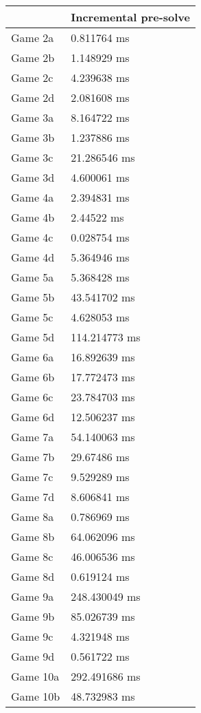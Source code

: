 \begin{tabular}{|l|l|}
	\hline
	& Incremental pre-solve \\ \hline
	Game 2a & 0.811764 ms \\ \hline
	Game 2b & 1.148929 ms \\ \hline
	Game 2c & 4.239638 ms \\ \hline
	Game 2d & 2.081608 ms \\ \hline
	Game 3a & 8.164722 ms \\ \hline
	Game 3b & 1.237886 ms \\ \hline
	Game 3c & 21.286546 ms \\ \hline
	Game 3d & 4.600061 ms \\ \hline
	Game 4a & 2.394831 ms \\ \hline
	Game 4b & 2.44522 ms \\ \hline
	Game 4c & 0.028754 ms \\ \hline
	Game 4d & 5.364946 ms \\ \hline
	Game 5a & 5.368428 ms \\ \hline
	Game 5b & 43.541702 ms \\ \hline
	Game 5c & 4.628053 ms \\ \hline
	Game 5d & 114.214773 ms \\ \hline
	Game 6a & 16.892639 ms \\ \hline
	Game 6b & 17.772473 ms \\ \hline
	Game 6c & 23.784703 ms \\ \hline
	Game 6d & 12.506237 ms \\ \hline
	Game 7a & 54.140063 ms \\ \hline
	Game 7b & 29.67486 ms \\ \hline
	Game 7c & 9.529289 ms \\ \hline
	Game 7d & 8.606841 ms \\ \hline
	Game 8a & 0.786969 ms \\ \hline
	Game 8b & 64.062096 ms \\ \hline
	Game 8c & 46.006536 ms \\ \hline
	Game 8d & 0.619124 ms \\ \hline
	Game 9a & 248.430049 ms \\ \hline
	Game 9b & 85.026739 ms \\ \hline
	Game 9c & 4.321948 ms \\ \hline
	Game 9d & 0.561722 ms \\ \hline
	Game 10a & 292.491686 ms \\ \hline
	Game 10b & 48.732983 ms \\ \hline

\end{tabular}
